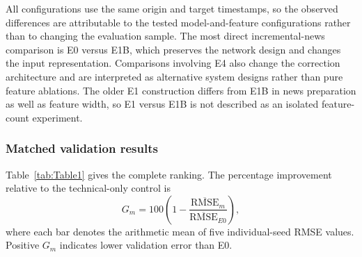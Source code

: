 All configurations use the same origin and target timestamps, so the observed differences are attributable to the tested model-and-feature configurations rather than to changing the evaluation sample. The most direct incremental-news comparison is E0 versus E1B, which preserves the network design and changes the input representation. Comparisons involving E4 also change the correction architecture and are interpreted as alternative system designs rather than pure feature ablations. The older E1 construction differs from E1B in news preparation as well as feature width, so E1 versus E1B is not described as an isolated feature-count experiment.

\subsubsection{Matched validation results}

Table~\ref{tab:Table1} gives the complete ranking. The percentage improvement relative to the technical-only control is
\begin{equation}
G_m=100\left(1-\frac{\overline{\mathrm{RMSE}}_m}{\overline{\mathrm{RMSE}}_{E0}}\right),
\label{eq:validation_gain}
\end{equation}
where each bar denotes the arithmetic mean of five individual-seed RMSE values. Positive $G_m$ indicates lower validation error than E0.


